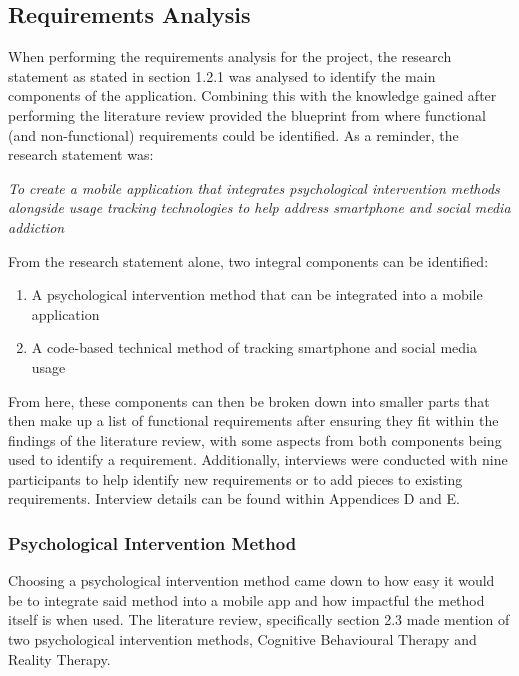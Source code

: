 \documentclass[12pt]{article}
\begin{document}
\newpage

\subsection{Requirements Analysis}
When performing the requirements analysis for the project, the research statement as stated in section 1.2.1 was analysed to identify the main components of the application. Combining this with
the knowledge gained after performing the literature review provided the blueprint from where functional (and non-functional) requirements could be identified. As a reminder, the research
statement was:\newline

\textit{To create a mobile application that integrates psychological intervention methods alongside usage tracking technologies to help address smartphone and social media addiction}\newline

From the research statement alone, two integral components can be identified:

\begin{enumerate}
	\item A psychological intervention method that can be integrated into a mobile application
	\item A code-based technical method of tracking smartphone and social media usage
\end{enumerate}

From here, these components can then be broken down into smaller parts that then make up a list of functional requirements after ensuring they fit within the findings of the literature
review, with some aspects from both components being used to identify a requirement. Additionally, interviews were conducted with nine participants to help identify new requirements or 
to add pieces to existing requirements. Interview details can be found within Appendices D and E. \newline

\subsubsection{Psychological Intervention Method}

Choosing a psychological intervention method came down to how easy it would be to integrate said method into a mobile app and how impactful the method itself is when used. The literature review,
specifically section 2.3 made mention of two psychological intervention methods, Cognitive Behavioural Therapy and Reality Therapy. \newline
\end{document}
